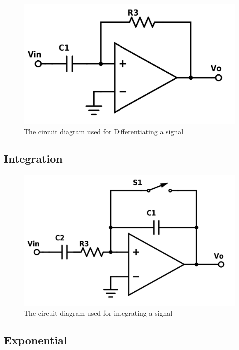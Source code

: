 \begin{figure}[ht!]
\centering
\includegraphics[scale=.25]{figures/460-17-2-Differentiator.png}
\caption{The circuit diagram used for Differentiating a signal}
\label{fig:CD_Diff}
\end{figure}

\subsection{Integration}

\begin{figure}[ht!]
\centering
\includegraphics[scale=.20]{figures/460-17-3-Intergrator.png}
\caption{The circuit diagram used for integrating a signal}
\label{fig:CD_Int}
\end{figure}

\subsection{Exponential}


